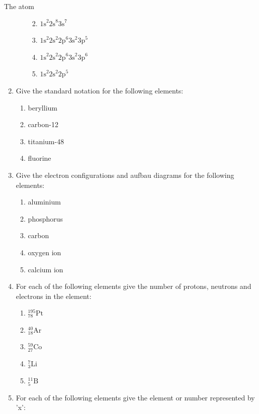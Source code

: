 \begin{eocexercises}{The atom}
\begin{enumerate}[noitemsep, label=\textbf{\arabic*}. ]
\begin{enumerate}[noitemsep, label=\textbf{\alph*}. ]
\begin{enumerate}[noitemsep, label=\textbf{\roman*}. ]
            \label{m38741*uid218}\item  ${1\text{s}}^{2}{2\text{s}}^{8}{3\text{s}}^{7}$\label{m38741*uid219}\item 
${1\text{s}}^{2}{2\text{s}}^{2}{2\text{p}}^{6}{3\text{s}}^{2}{3\text{p}}^{5}$
\label{m38741*uid220}\item 
${1\text{s}}^{2}{2\text{s}}^{2}{2\text{p}}^{6}{3\text{s}}^{2}{3\text{p}}^{6}$\label{m38741*uid221}\item 
${1\text{s}}^{2}{2\text{s}}^{2}{2\text{p}}^{5}$\end{enumerate}
                \end{enumerate}
        \item Give the standard notation for the following elements:
\label{m38741*id8223}\begin{enumerate}[noitemsep, label=\textbf{\alph*}. ] 
            \item beryllium
\item carbon-12
\item titanium-48
\item fluorine
\end{enumerate}
\item Give the electron configurations and aufbau diagrams for the following elements:\label{m38741*id7624}\begin{enumerate}[noitemsep, label=\textbf{\alph*}. ] 
            \item aluminium
\item phosphorus
\item carbon
\item oxygen ion
\item calcium ion
\end{enumerate}
\item For each of the following elements give the number of protons, neutrons and electrons in the element: \label{m38741*id74374}\begin{enumerate}[noitemsep, label=\textbf{\alph*}. ] 
            \item $_{78}^{195}\text{Pt}$
\item $_{18}^{40}\text{Ar}$
\item $_{27}^{59}\text{Co}$
\item $_{3}^{7}\text{Li}$
\item $_{5}^{11}\text{B}$
\end{enumerate}
\item For each of the following elements give the element or number represented by 'x': \label{m38741*id7434324}\begin{enumerate}[noitemsep, label=\textbf{\alph*}. ] 

\end{enumerate}
\end{enumerate}
\end{eocexercises}
